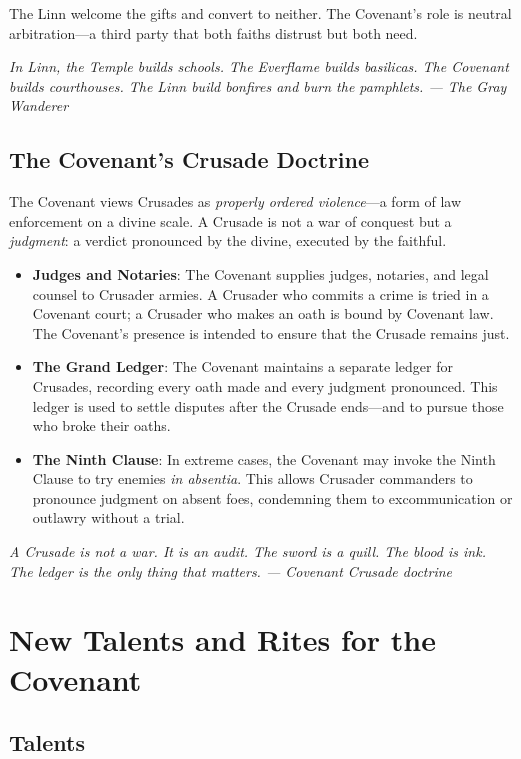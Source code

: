 \documentclass{book}
\newcommand{\citation}[1]{\textcolor{marginalia}{\small\textit{#1}}}
\begin{document}
The Linn welcome the gifts and convert to neither. The Covenant's role is neutral arbitration---a third party that both faiths distrust but both need.

\citation{In Linn, the Temple builds schools. The Everflame builds basilicas. The Covenant builds courthouses. The Linn build bonfires and burn the pamphlets. --- The Gray Wanderer}

\section{The Covenant's Crusade Doctrine}

The Covenant views Crusades as \textit{properly ordered violence}---a form of law enforcement on a divine scale. A Crusade is not a war of conquest but a \textit{judgment}: a verdict pronounced by the divine, executed by the faithful.

\begin{itemize}
\item \textbf{Judges and Notaries}: The Covenant supplies judges, notaries, and legal counsel to Crusader armies. A Crusader who commits a crime is tried in a Covenant court; a Crusader who makes an oath is bound by Covenant law. The Covenant's presence is intended to ensure that the Crusade remains just.
\item \textbf{The Grand Ledger}: The Covenant maintains a separate ledger for Crusades, recording every oath made and every judgment pronounced. This ledger is used to settle disputes after the Crusade ends---and to pursue those who broke their oaths.
\item \textbf{The Ninth Clause}: In extreme cases, the Covenant may invoke the Ninth Clause to try enemies \textit{in absentia}. This allows Crusader commanders to pronounce judgment on absent foes, condemning them to excommunication or outlawry without a trial.
\end{itemize}

\citation{A Crusade is not a war. It is an audit. The sword is a quill. The blood is ink. The ledger is the only thing that matters. --- Covenant Crusade doctrine}

\chapter{New Talents and Rites for the Covenant}

\section{Talents}
\end{document}
